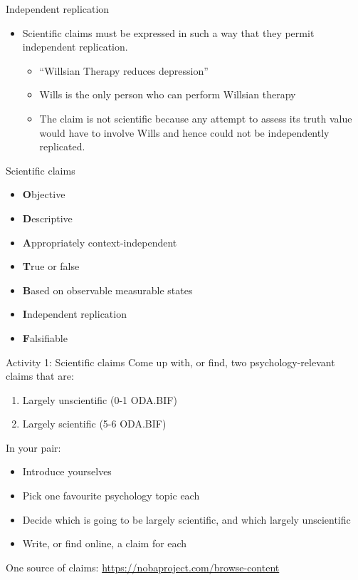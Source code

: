 \documentclass{beamer}
\begin{document}
\begin{frame}{Independent replication}
	\begin{itemize}
		\item Scientific claims must be expressed in such a way that they permit independent replication.
		\begin{itemize}
			\item ``Willsian Therapy reduces depression''
			\item Wills is the only person who can perform Willsian therapy
			\item The claim is not scientific because any attempt to assess its truth value would have to involve Wills and hence could not be independently replicated.
		\end{itemize}
	\end{itemize}
\end{frame}

\begin{frame}{Scientific claims}
	\begin{itemize}
		\item \textbf{O}bjective
		\item \textbf{D}escriptive 
		\item \textbf{A}ppropriately context-independent
		\item \textbf{T}rue or false	
		\item \textbf{B}ased on observable measurable states
		\item \textbf{I}ndependent replication
		\item \textbf{F}alsifiable
	\end{itemize}
\end{frame}

\begin{frame}{Activity 1: Scientific claims}
  Come up with, or find, two psychology-relevant claims that are:
  \begin{enumerate}
    \item Largely unscientific (0-1 ODA.BIF)
    \item Largely scientific (5-6 ODA.BIF)
  \end{enumerate}
  In your pair:
  \begin{itemize}
    \item Introduce yourselves
    \item Pick one favourite psychology topic each
    \item Decide which is going to be largely scientific, and which largely unscientific
    \item Write, or find online, a claim for each
  \end{itemize}
  One source of claims: \url{https://nobaproject.com/browse-content}  
\end{frame}
\end{document}
